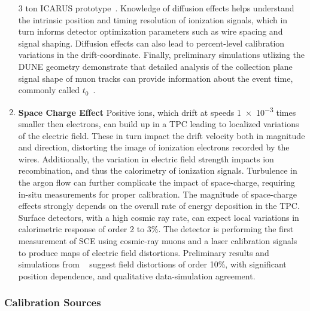 \begin{enumerate}
\num{3} ton ICARUS prototype~\cite{bib:ICARUSdiffusion}. Knowledge of diffusion effects helps understand the intrinsic position and timing resolution of ionization signals, which in turn informs detector optimization parameters such as wire spacing and signal shaping. Diffusion effects can also lead to percent-level calibration variations in the drift-coordinate. Finally, preliminary simulations utlizing the DUNE  geometry demonstrate that detailed analysis of the collection plane signal shape of   muon tracks can provide information about the event time, commonly called $t_0$~\cite{Warburton:2017ixr}. 
\item \textbf{Space Charge Effect} Positive ions, which drift at speeds \num{1e-3} %
times smaller then electrons, can build up in a TPC leading to localized variations of the electric field. These in turn impact the drift velocity both in magnitude and direction, distorting the image of ionization electrons recorded by the wires. Additionally, the variation in electric field strength impacts ion recombination, and thus the calorimetry of ionization signals. Turbulence in the argon flow can further complicate the impact of space-charge, requiring in-situ measurements for proper calibration. The magnitude of space-charge effects strongly depends on the overall rate of energy deposition in the TPC. Surface detectors, with a high cosmic ray rate, can expect local variations in calorimetric response of order \num{2} to \num{3}\%. The  detector is performing the first measurement of SCE using cosmic-ray muons and a laser calibration signals to produce maps of electric field distortions. Preliminary results and simulations from ~\cite{bib:uBspacecharge} suggest field distortions of order \num{10}\%, with significant position dependence, and qualitative data-simulation agreement.
\end{enumerate}

\subsubsection{Calibration Sources}

